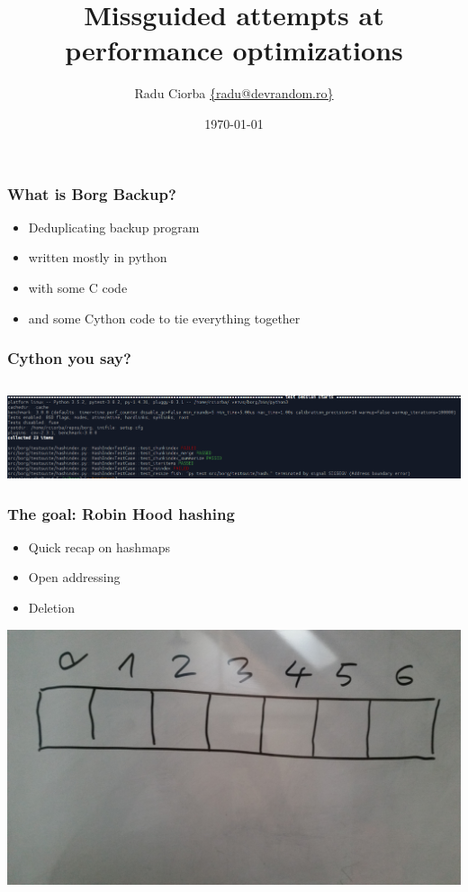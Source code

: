 \documentclass{beamer}
\title[Robin Hood Hashing]{Missguided attempts at performance optimizations} %
\author{Radu Ciorba \href{mailto:radu@devrandom.ro}{\{radu@devrandom.ro\}}} %
\date{\today} %
\begin{document}
\begin{frame}
  \titlepage %
\end{frame}

\begin{frame}
  \frametitle{What is Borg Backup?}
  \begin{itemize}
  \item Deduplicating backup program
  \item written mostly in python
  \item with some C code
  \item and some Cython code to tie everything together
  \end{itemize}
\end{frame}

\begin{frame}
  \frametitle{Cython you say?}
  \inputminted[fontsize=\footnotesize]{python}{snippets/example.pyx}
\end{frame}


\begin{frame}
 \begin{center}
 \includegraphics[scale=0.245,keepaspectratio=true]{./segfault.png}
 \end{center}
\end{frame}

\begin{frame}
  \frametitle{The goal: Robin Hood hashing}
  \begin{itemize}
  \item Quick recap on hashmaps
  \item Open addressing
  \item Deletion
  \end{itemize}
\end{frame}


\begin{frame}
 \begin{center}
 \includegraphics[scale=0.06,keepaspectratio=true]{./images/1.jpg}
 \end{center}
\end{frame}
\end{document}

